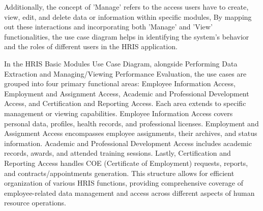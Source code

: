     Additionally, the concept of 'Manage' refers to the access users have to create, view, edit, and delete data or information within specific modules, By mapping out these interactions and incorporating both 'Manage' and 'View' functionalities, the use case diagram helps in identifying the system's behavior and the roles of different users in the HRIS application.

    In the HRIS Basic Modules Use Case Diagram, alongside Performing Data Extraction and Managing/Viewing Performance Evaluation, the use cases are grouped into four primary functional areas: Employee Information Access, Employment and Assignment Access, Academic and Professional Development Access, and Certification and Reporting Access. Each area extends to specific management or viewing capabilities. Employee Information Access covers personal data, profiles, health records, and professional licenses. Employment and Assignment Access encompasses employee assignments, their archives, and status information. Academic and Professional Development Access includes academic records, awards, and attended training sessions. Lastly, Certification and Reporting Access handles COE (Certificate of Employment) requests, reports, and contracts/appointments generation. This structure allows for efficient organization of various HRIS functions, providing comprehensive coverage of employee-related data management and access across different aspects of human resource operations.

